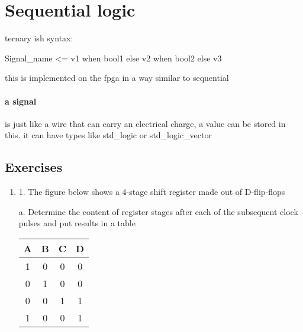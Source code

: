 \section*{Sequential logic}
ternary ish syntax:

Signal_name <= v1 when bool1 else v2 when bool2 else v3

this is implemented on the fpga in a way similar to sequential

\paragraph*{a signal} is just like a wire that can carry an electrical charge, a value can be stored in this. it can have types like std_logic or std_logic_vector

\subsection*{Exercises}
\begin{enumerate}
    \item 1. The figure below shows a 4-stage shift register made out of D-flip-flops
    
    a. Determine the content of register stages after each of the subsequent clock pulses and put results in a table

    \begin{table}[H]
        \centering
        \begin{tabular}{|c|c|c|c|}
            \hline
            A & B & C & D \\\hline
            1 & 0 & 0 & 0 \\\hline
            0 & 1 & 0 & 0 \\\hline
            0 & 0 & 1 & 1 \\\hline
            1 & 0 & 0 & 1 \\\hline
        \end{tabular}
    \end{table}
\end{enumerate}